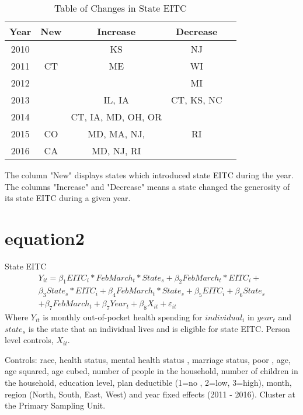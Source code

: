 \documentclass[t, hyperref={colorlinks=true}, compress]{beamer}
\begin{document}
\begin{frame}
\begin{table}\caption{Table of Changes in State EITC} 
\begin{tabular}{| ccccc |}
\textbf{Year} & \textbf{New} & \textbf{Increase}&	\textbf{Decrease} \\
\hline
2010	&&	KS &	NJ  \\
2011 &	CT&	ME &	WI	  \\
2012	&	&		&	MI	\\
2013	&&	IL, IA	&CT, KS, NC	\\
2014	 & &	CT, IA, MD, OH, OR		& \\
2015 &	CO& 	MD, MA, NJ,	&RI	 \\
2016& 	CA &	MD, NJ, RI	&	\\
\hline
\end{tabular}
\begin{minipage}{8cm}
		\footnotesize{
The column "New" displays states which introduced state EITC during the year. The columns "Increase"  and "Decrease" means a state changed the generosity of its state EITC during a given year.}
\end{minipage}
\end{table}
\end{frame}













\section{equation2}
\begin{frame}{State EITC} 
\begin{multline}
Y_{it} =  \beta_{1}EITC_{i}  * FebMarch_{t} *State_{s} +\beta_{2}FebMarch_{t}*EITC_{i} + \\  
\beta_{3} State_{s} *EITC_{i} + 
\beta_{4} FebMarch_{t} *State_{s} +  \beta_{5} EITC_{i}  +\beta_{6}State_{s}  \\ 
  +\beta_{7}FebMarch_{t}+  \beta_{7} Year_{t}  + \beta_{8}  X_{it}  +\varepsilon_{it}   \label{eq_stateEITC} 
\end{multline}
Where $Y_{it}$ is monthly out-of-pocket health spending for $individual_{i}$ in $year_{t}$ and $state_{s}$ is the state that an individual lives and is eligible for state EITC. Person level controls, $X_{it}$.

\bigskip
\bigskip

\footnotesize Controls: race, health status, mental health status , marriage status, poor , age, age squared, age cubed, number of people in the household, number of children in the household, education level, plan deductible (1=no , 2=low, 3=high), month, region (North, South, East, West) and year fixed effects (2011 - 2016). Cluster at the Primary Sampling Unit. 
\end{frame}
\end{document}
